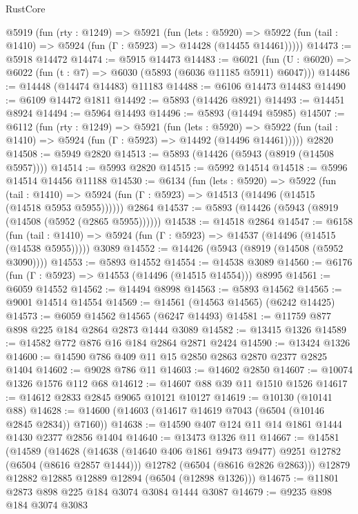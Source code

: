 \begin{lexlean}{RustCore}
\begin{coremodule}
  @5919
    (fun (rty : @1249) =>
    @5921
      (fun (lets : @5920) =>
      @5922 (fun (tail : @1410) => @5924 (fun (Γ : @5923) => @14428 (@14455 @14461)))))
@14473 := @5918 @14472
@14474 := @5915 @14473
@14483 := @6021
    (fun (U : @6020) => @6022 (fun (t : @7) => @6030 (@5893 (@6036 @11185 @5911) @6047)))
@14486 := @14448 (@14474 @14483) @11183
@14488 := @6106 @14473 @14483
@14490 := @6109 @14472 @1811
@14492 := @5893 (@14426 @8921)
@14493 := @14451 @8924
@14494 := @5964 @14493
@14496 := @5893 (@14494 @5985)
@14507 := @6112
    (fun (rty : @1249) =>
    @5921
      (fun (lets : @5920) =>
      @5922 (fun (tail : @1410) => @5924 (fun (Γ : @5923) => @14492 (@14496 @14461)))))
    @2820
@14508 := @5949 @2820
@14513 := @5893 (@14426 (@5943 (@8919 (@14508 @5957))))
@14514 := @5993 @2820
@14515 := @5992 @14514
@14518 := @5996 @14514 @14456 @11188
@14530 := @6134
    (fun (lets : @5920) =>
    @5922
      (fun (tail : @1410) =>
      @5924 (fun (Γ : @5923) => @14513 (@14496 (@14515 (@14518 @5953 @5955))))))
    @2864
@14537 := @5893 (@14426 (@5943 (@8919 (@14508 (@5952 (@2865 @5955))))))
@14538 := @14518 @2864
@14547 := @6158
    (fun (tail : @1410) => @5924 (fun (Γ : @5923) => @14537 (@14496 (@14515 (@14538 @5955)))))
    @3089
@14552 := @14426 (@5943 (@8919 (@14508 (@5952 @3090))))
@14553 := @5893 @14552
@14554 := @14538 @3089
@14560 := @6176 (fun (Γ : @5923) => @14553 (@14496 (@14515 @14554))) @8995
@14561 := @6059 @14552
@14562 := @14494 @8998
@14563 := @5893 @14562
@14565 := @9001 @14514 @14554
@14569 := @14561 (@14563 @14565) (@6242 @14425)
@14573 := @6059 @14562 @14565 (@6247 @14493)
@14581 := @11759 @877 @898 @225 @184 @2864 @2873 @1444 @3089
@14582 := @13415 @1326
@14589 := @14582 @772 @876 @16 @184 @2864 @2871 @2424
@14590 := @13424 @1326
@14600 := @14590 @786 @409 @11 @15 @2850 @2863 @2870 @2377 @2825 @1404
@14602 := @9028 @786 @11
@14603 := @14602 @2850
@14607 := @10074 @1326 @1576 @112 @68
@14612 := @14607 @88 @39 @11 @1510 @1526
@14617 := @14612 @2833 @2845 @9065 @10121 @10127
@14619 := @10130 (@10141 @88)
@14628 := @14600 (@14603 (@14617 @14619 @7043 (@6504 (@10146 @2845 @2834)) @7160))
@14638 := @14590 @407 @124 @11 @14 @1861 @1444 @1430 @2377 @2856 @1404
@14640 := @13473 @1326 @11
@14667 := @14581
    (@14589
      (@14628
        (@14638 (@14640 @406 @1861 @9473 @9477) @9251 @12782 (@6504 (@8616 @2857 @1444)))
        @12782
        (@6504 (@8616 @2826 @2863)))
      @12879
      @12882
      @12885
      @12889
      @12894
      (@6504 (@12898 @1326)))
@14675 := @11801 @2873 @898 @225 @184 @3074 @3084 @1444 @3087
@14679 := @9235 @898 @184 @3074 @3083

\end{coremodule}
\end{lexlean}
